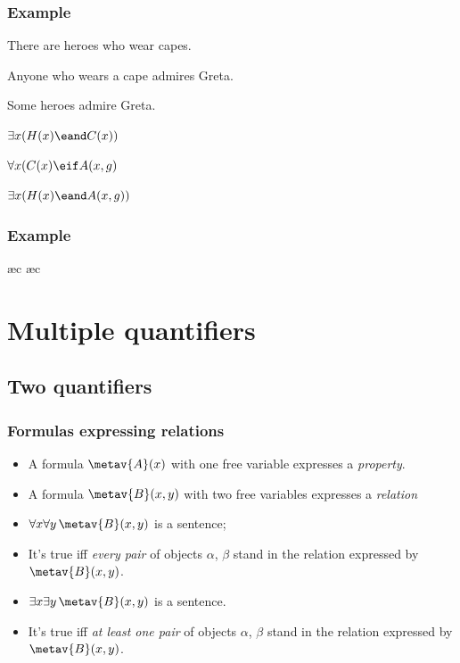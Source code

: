 \begin{frame}
\frametitle{Example}

\begin{earg}
  \item[] There are heroes who wear capes.
  \item[] Anyone who wears a cape admires Greta.
  \item[\therefore] Some heroes admire Greta.
\end{earg}
\bigskip
\begin{earg}
  \item[] $\exists x(H(x) \eand C(x))$
  \item[] $\forall x(C(x) \eif A(x,g)$
  \item[\therefore] $\exists x(H(x) \eand A(x,g))$
\end{earg}
\end{frame}

\begin{frame}
\frametitle{Example}
\small
\begin{fitchproof}
  \open
  \ae{c}
  \ae{c}
  \close
\end{fitchproof}
\end{frame}


\newhourlecture
\newonlinelecture

\section{Multiple quantifiers}

\subsection{Two quantifiers}

\begin{frame}
  \frametitle{Formulas expressing relations}

\begin{itemize}[<+->]
  \item A formula $\metav{A}(x)$ with one free variable expresses a \emph{property}.
  \item A formula $\metav{B}(x, y)$ with two free variables expresses a \emph{relation}
  \item $\forall x\forall y\, \metav{B}(x, y)$ is a sentence; 
  \item It's true iff 
  \emph{every pair} of objects $\alpha$, $\beta$ stand in the relation expressed by $\metav{B}(x, y)$.
  \item $\exists x\exists y\, \metav{B}(x, y)$ is a sentence.
  \item It's true iff
  \emph{at least one pair} of objects $\alpha$, $\beta$ stand in the relation expressed by $\metav{B}(x, y)$.
\end{itemize}
\end{frame}

